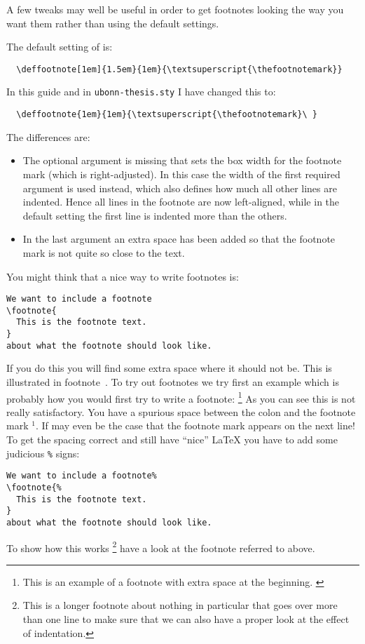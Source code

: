 A few tweaks may well be useful in order to get footnotes looking the
way you want them rather than using the default \KOMAScript{}
settings.

The default setting of \KOMAScript{} is:
\begin{verbatim}
  \deffootnote[1em]{1.5em}{1em}{\textsuperscript{\thefootnotemark}}
\end{verbatim}
In this guide and in \texttt{ubonn-thesis.sty} I have changed this to:
\begin{verbatim}
  \deffootnote{1em}{1em}{\textsuperscript{\thefootnotemark}\ }
\end{verbatim}
The differences are:
\begin{itemize}
\item The optional argument is missing that sets the box width for the
  footnote mark (which is right-adjusted). In this case the width of
  the first required argument is used instead, which also defines how
  much all other lines are indented. Hence all lines in the footnote
  are now left-aligned, while in the default setting the first line is
  indented more than the others.
\item In the last argument an extra space has been added so that the
  footnote mark is not quite so close to the text.
\end{itemize}

You might think that a nice way to write footnotes is:
\begin{verbatim}
We want to include a footnote
\footnote{
  This is the footnote text.
}
about what the footnote should look like.
\end{verbatim}
If you do this you will find some extra space where it should not be.
This is illustrated in footnote~.
To try out footnotes we try first an example which is probably how you
would first try to write a footnote:
\footnote{
  This is an example of a footnote with extra space at the beginning.
  \label{foot:short}
}
As you can see this is not really satisfactory. You have a spurious
space between the colon and the footnote mark $^{1}$. If may even
be the case that the footnote mark appears on the next line! To get the spacing
correct and still have \enquote{nice} \LaTeX{} you have to add some
judicious \texttt{\%} signs:
\begin{verbatim}
We want to include a footnote%
\footnote{%
  This is the footnote text.
}
about what the footnote should look like.
\end{verbatim}
To show how this works%
\footnote{\label{foot:long}%
  This is a longer footnote about nothing in particular that goes
  over more than one line to make sure that we can also have a proper
  look at the effect of indentation.}
have a look at the footnote referred to above.

